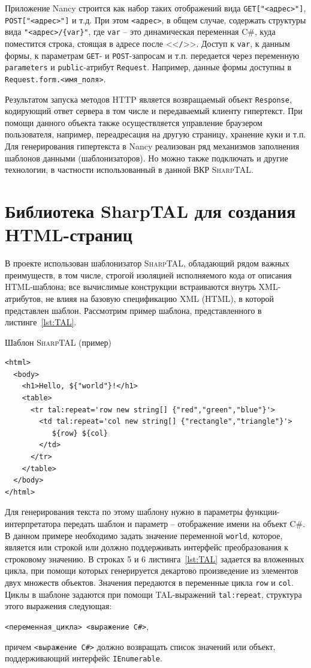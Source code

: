 \documentclass[a4paper,14pt,openany,final]{extreport} %
\begin{document}
Приложение Nancy строится как набор таких отображений вида \verb|GET["<адрес>"]|, \verb|POST["<адрес>"]| и т.д. При этом \verb|<адрес>|, в общем случае, содержать структуры вида \verb|"<адрес>/{var}"|, где \verb|var| -- это динамическая переменная C\#, куда поместится строка, стоящая в адресе после <<\verb|/|>>. Доступ к \verb|var|, к данным формы, к параметрам \verb|GET|- и \verb|POST|-запросам и т.п. передается через переменную \verb|parameters| и \verb|public|-атрибут \verb|Request|. Например, данные формы доступны в \verb|Request.form.<имя_поля>|.

Результатом запуска методов HTTP является возвращаемый объект \verb|Response|, кодирующий ответ сервера в том числе и передаваемый клиенту гипертекст. При помощи данного объекта также осуществляется управление браузером пользователя, например, переадресация на другую страницу, хранение куки и т.п.  Для генерирования гипертекста в Nancy реализован ряд механизмов заполнения шаблонов данными (шаблонизаторов). Но можно также подключать и другие технологии, в частности использованный в данной ВКР \textsc{SharpTAL}.


\section{Библиотека SharpTAL для создания HTML-страниц}
В проекте использован шаблонизатор \textsc{SharpTAL}, обладающий рядом важных преимуществ, в том числе, строгой изоляцией исполняемого кода от описания HTML-шаблона; все вычислимые конструкции встраиваются внутрь XML-атрибутов, не влияя на базовую спецификацию XML (HTML), в которой представлен шаблон.  Рассмотрим пример шаблона, представленного в листинге~\ref{lst:TAL}.

\begin{pzlisting}
  \caption{Шаблон \textsc{SharpTAL} (пример)}\label{lst:TAL}
\begin{verbatim}
<html>
  <body>
    <h1>Hello, ${"world"}!</h1>
    <table>
      <tr tal:repeat='row new string[] {"red","green","blue"}'>
        <td tal:repeat='col new string[] {"rectangle","triangle"}'>
           ${row} ${col}
        </td>
      </tr>
    </table>
  </body>
</html>
\end{verbatim}
\end{pzlisting}

Для генерирования текста по этому шаблону нужно в параметры функции-интерпретатора передать шаблон и параметр -- отображение имени на объект C\#.  В данном примере необходимо задать значение переменной \verb|world|, которое, является или строкой или должно поддерживать интерфейс преобразования к строковому значению.  В строках 5 и 6 листинга~\ref{lst:TAL} задается ва вложенных цикла, при помощи которых генерируется декартово произведение из элементов двух множеств объектов. Значения передаются в переменные цикла \verb|row| и \verb|col|.  Циклы в шаблоне задаются при помощи TAL-выражений \verb|tal:repeat|, структура этого выражения следующая:
\begin{center}
\verb|<переменная_цикла> <выражение C#>|,
\end{center}
причем \verb|<выражение С#>| должно возвращать список значений или объект, поддерживающий интерфейс \verb|IEnumerable|.
\end{document}

